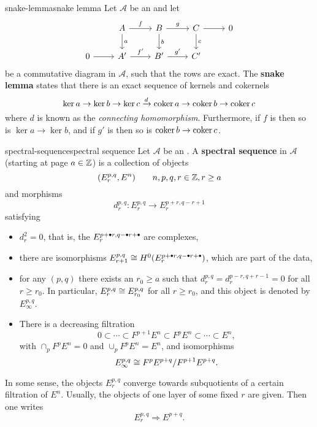 \begin{topic}{snake-lemma}{snake lemma}
    Let $\mathcal{A}$ be an  and let
    \[ \svg \begin{tikzcd} & A \arrow{d}{a} \arrow{r}{f} & B \arrow{d}{b} \arrow{r}{g} & C \arrow{d}{c} \arrow{r} & 0 \\ 0 \arrow{r} & A' \arrow{r}{f'} & B' \arrow{r}{g'} & C' \end{tikzcd} \]
    be a commutative diagram in $\mathcal{A}$, such that the rows are exact. The \textbf{snake lemma} states that there is an exact sequence of kernels and cokernels
    \[ \ker a \rightarrow \ker b \rightarrow \ker c \xrightarrow{d} \operatorname{coker} a \rightarrow \operatorname{coker} b \rightarrow \operatorname{coker} c \]
    where $d$ is known as the \textit{connecting homomorphism}. Furthermore, if $f$ is  then so is $\ker a \to \ker b$, and if $g'$ is  then so is $\operatorname{coker} b \to \operatorname{coker} c$.
\end{topic}

\begin{topic}{spectral-sequence}{spectral sequence}
    Let $\mathcal{A}$ be an . A \textbf{spectral sequence} in $\mathcal{A}$ (starting at page $a \in \mathbb{Z}$) is a collection of objects
    \[ (E_r^{p, q}, E^n) \qquad n, p, q, r \in \mathbb{Z}, r \ge a \]
    and morphisms
    \[ d_r^{p, q} \colon E_r^{p, q} \to E_r^{p + r, q - r + 1} \]
    satisfying
    \begin{itemize}
        \item $d_r^2 = 0$, that is, the $E_r^{p + \bdot r, q - \bdot r + \bdot}$ are complexes,
        \item there are isomorphisms $E_{r + 1}^{p, q} \isom H^0(E_r^{p + \bdot r, q - \bdot r + \bdot})$, which are part of the data,
        \item for any $(p, q)$ there exists an $r_0 \ge a$ such that $d_r^{p, q} = d_r^{p - r, q + r - 1} = 0$ for all $r \ge r_0$. In particular, $E_r^{p, q} \cong E_{r_0}^{p, q}$ for all $r \ge r_0$, and this object is denoted by $E_\infty^{p, q}$.
        \item There is a decreasing filtration
        \[ 0 \subset \cdots \subset F^{p + 1} E^n \subset F^p E^n \subset \cdots \subset E^n , \]
        with $\cap_p F^p E^n = 0$ and $\cup_p F^p E^n = E^n$, and isomorphisms
        \[ E_\infty^{p, q} \cong F^p E^{p + q} / F^{p + 1} E^{p + q} . \]
    \end{itemize}
    
    In some sense, the objects $E_r^{p, q}$ converge towards subquotients of a certain filtration of $E^n$. Usually, the objects of one layer of some fixed $r$ are given. Then one writes
    \[ E_r^{p, q} \Rightarrow E^{p + q} . \]
\end{topic}

